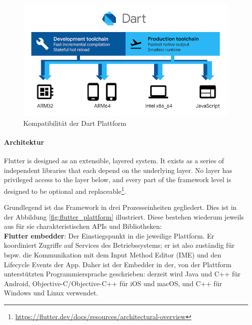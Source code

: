 \begin{figure}[tbt]
	\begin{center}
		\includegraphics[scale=0.45]{Theoretische_Grundlagen/images/dart-diagram.png}
	\end{center}
	\caption[Kompatibilität der Dart Plattform]{Kompatibilität der Dart Plattform \protect \footnotemark}
	\label{fig:dart_plattform}
\end{figure}

\paragraph{Architektur}
\begin{displayquote}
	Flutter is designed as an extensible, layered system. It exists as a series of independent libraries that each depend on the underlying layer. No layer has privileged access to the layer below, and every part of the framework level is designed to be optional and replaceable\footnote{\url{https://flutter.dev/docs/resources/architectural-overview}}.
\end{displayquote}

\noindent
Grundlegend ist das Framework in drei Prozesseinheiten gegliedert. Dies ist in der Abbildung \ref{fig:flutter_plattform} illustriert. Diese bestehen wiederum jeweils aus für sie charakteristischen APIs und Bibliotheken:\\

\noindent
{}
\textbf{Flutter embedder}: Der Einstiegspunkt in die jeweilige Plattform. Er koordiniert Zugriffe auf Services des Betriebssystems; er ist also zuständig für bspw. die Kommunikation mit dem Input Method Editor (IME) und den Lifecycle Events der App. Daher ist der Embedder in der, von der Plattform unterstützten Programmiersprache geschrieben: derzeit wird Java und C++ für Android, Objective-C/Objective-C++ für iOS und macOS, und C++ für Windows und Linux verwendet.\\

